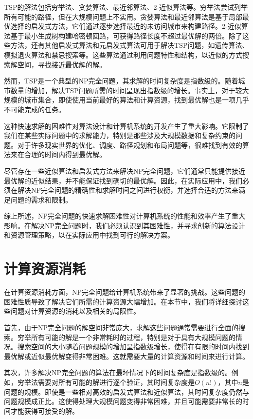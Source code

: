 \documentclass[UTF8,openany,zihao=5]{ctexbook}
\begin{document}
TSP的解法包括穷举法、贪婪算法、最近邻算法、2-近似算法等。穷举法尝试列举所有可能的路径，但在大规模问题上不实用。贪婪算法和最近邻算法是基于局部最优选择的启发式方法，它们通过逐步选择最近的未访问城市来构建路径。2-近似算法基于最小生成树构建哈密顿回路，可获得路径长度不超过最优解的两倍。除了这些方法，还有其他启发式算法和元启发式算法可用于解决TSP问题，如遗传算法、模拟退火算法和禁忌搜索等\cite{bi:STV}。这些算法通过利用问题特性和结构，以近似的方式搜索解空间，寻找接近最优解的解。

然而，TSP是一个典型的NP完全问题，其求解的时间复杂度是指数级的。随着城市数量的增加，解决TSP问题所需的时间呈现出指数级的增长。事实上，对于较大规模的城市集合，即使使用当前最好的算法和计算资源，找到最优解也是一项几乎不可能完成的任务。

这种快速求解的困难性对算法设计和计算机系统的开发产生了重大影响。它限制了我们在某些实际问题中的求解能力，特别是那些涉及大规模数据和复杂约束的问题。对于许多现实世界的优化、调度、路径规划和布局问题等，很难找到有效的算法来在合理的时间内得到最优解。

尽管存在一些近似算法和启发式方法来解决NP完全问题，它们通常只能提供接近最优解的近似结果，并不能保证找到确切的最优解。因此，在实际应用中，我们必须在解决NP完全问题的精确性和求解时间之间进行权衡，并选择合适的方法来满足问题的需求和限制。

综上所述，NP完全问题的快速求解困难性对计算机系统的性能和效率产生了重大影响。在解决NP完全问题时，我们必须认识到其困难性，并寻求创新的算法设计和资源管理策略，以在实际应用中找到可行的解决方案。

\section{计算资源消耗}

在计算资源消耗方面，NP完全问题给计算机系统带来了显著的挑战。这些问题的困难性质导致了解决它们所需的计算资源大幅增加。在本节中，我们将详细探讨这些问题对计算资源的消耗以及相关的局限性。

首先，由于NP完全问题的解空间非常庞大，求解这些问题通常需要进行全面的搜索。穷举所有可能的解是一个非常耗时的过程，特别是对于具有大规模问题的情况。搜索空间的大小随着问题规模的增加呈指数级增长，使得在有限的时间内找到最优解或近似最优解变得非常困难。这就需要大量的计算资源和时间来进行计算。

其次，许多解决NP完全问题的算法在最坏情况下的时间复杂度是指数级的。例如，穷举法需要对所有可能的解进行逐个验证，其时间复杂度是$O(n!)$，其中$n$是问题的规模。即使是一些相对高效的启发式算法和近似算法，其时间复杂度仍然与问题规模成正比。这使得处理大规模问题变得非常困难，并且可能需要非常长的时间才能获得可接受的解。
\end{document}
